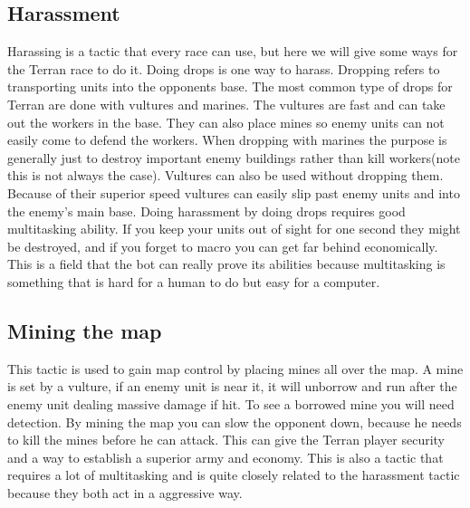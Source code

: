 	\subsection{Harassment}
		Harassing is a tactic that every race can use, but here we will give some ways for the Terran race to do it. 
		Doing drops is one way to harass. Dropping refers to transporting units into the opponents base. 
		The most common type of drops for Terran are done with vultures and marines. The vultures are fast and can take out the workers in the base. 
		They can also place mines so enemy units can not easily come to defend the workers. When dropping with marines 
		the purpose is generally just to destroy important enemy buildings rather than kill workers(note this is not always the case). 
		Vultures can also be used without dropping them. 
		Because of their superior speed vultures can easily slip past enemy units and into the enemy's main base. Doing harassment by doing drops requires 
		good multitasking ability. If you keep your units out of sight for one second they might be destroyed, 
		and if you forget to macro you can get far behind economically. 
		This is a field that the bot can really prove its abilities because 
		multitasking is something that is hard for a human to do but easy for a computer.
	
	\subsection{Mining the map}
		This tactic is used to gain map control by placing mines all over the map. A mine is set by a vulture, 
		if an enemy unit is near it, it will unborrow and run after the enemy unit dealing massive damage if hit. To see a borrowed mine you will need 
		detection. By mining the map you can slow the opponent down, because he needs to kill the mines before he can attack. 
		This can give the Terran player security and a way to establish a superior army and economy. 
		This is also a tactic that requires a lot of multitasking and is quite closely related to the harassment tactic because they both act in a 
		aggressive way.